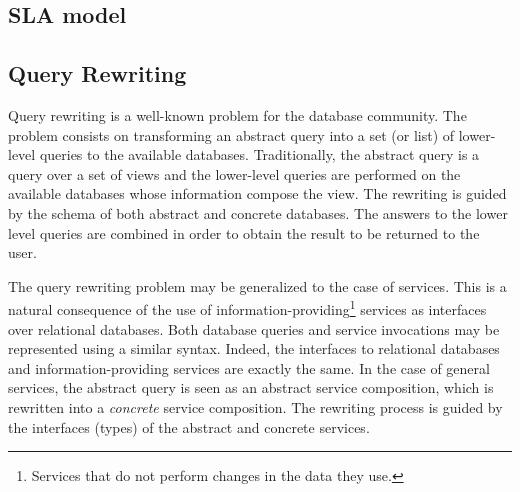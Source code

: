 \subsection{SLA model}
\label{sec:slaModel}

%




\subsection{Query Rewriting}
\label{sec:queryRew}

Query rewriting is a well-known problem for the database community.
The problem consists on transforming an abstract query into a set (or list) of lower-level queries to the available databases.
Traditionally, the abstract query is a query over a set of views and the lower-level queries are performed on the available databases whose information compose the view. 
The rewriting is guided by the schema of both abstract and concrete databases.
The answers to the lower level queries are combined in order to obtain the result to be returned to the user.

The query rewriting problem may be generalized to the case of services.
This is a natural consequence of the use of information-providing\footnote{Services that do not perform changes in the data they use.} services as interfaces over relational databases.
Both database queries and service invocations may be represented using a similar syntax.
Indeed, the interfaces to relational databases and information-providing services are exactly the same.
In the case of general services, the abstract query is seen as an abstract service composition, which is rewritten into a \textit{concrete} service composition.
The rewriting process is guided by the interfaces (types) of the abstract and concrete services.

